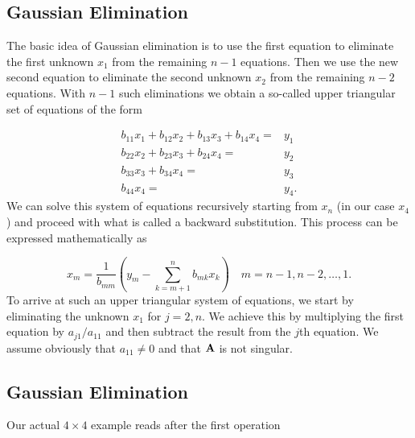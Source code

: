 \documentclass[%
twoside,                 %
final,                   %
10pt]{article}
\begin{document}
{{%
\subsection{Gaussian Elimination}

The basic idea of Gaussian elimination is to use the first equation to eliminate the first unknown $x_1$
from the remaining $n-1$ equations. Then we use the new second equation to eliminate the second unknown
$x_2$ from the remaining $n-2$ equations. With $n-1$ such eliminations
we obtain a so-called upper triangular set of equations of the form

\begin{align}\label{eq:gaussbacksub}
 b_{11}x_1 +b_{12}x_2 +b_{13}x_3 + b_{14}x_4=&y_1 \nonumber \\
 b_{22}x_2 + b_{23}x_3 + b_{24}x_4=&y_2 \nonumber \\
b_{33}x_3 + b_{34}x_4=&y_3 \nonumber \\
b_{44}x_4=&y_4. \nonumber
\end{align}
We can solve this system of equations recursively starting from $x_n$ (in our case $x_4$) and proceed with
what is called a backward substitution. This process can be expressed mathematically as

\begin{equation}
   x_m = \frac{1}{b_{mm}}\left(y_m-\sum_{k=m+1}^nb_{mk}x_k\right)\quad m=n-1,n-2,\dots,1.
\end{equation}
To arrive at such an upper triangular system of equations, we start by eliminating
the unknown $x_1$ for $j=2,n$. We achieve this by multiplying the first equation by $a_{j1}/a_{11}$ and then subtract
the result from the $j$th equation. We assume obviously that $a_{11}\ne 0$ and that
${\bf A}$ is not singular.

\subsection{Gaussian Elimination}

Our actual $4\times 4$ example reads after the first operation

}}
\end{document}
